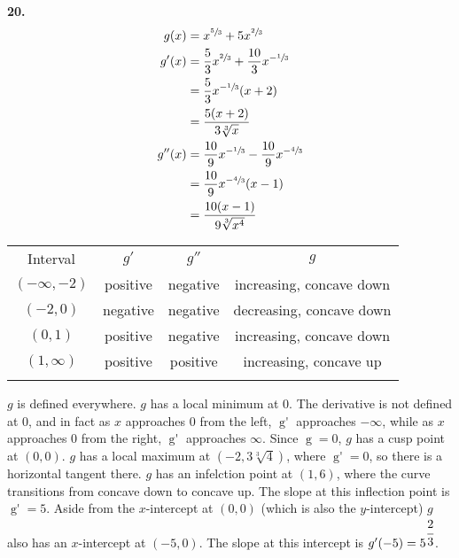 \documentclass[12pt,]{book}
\theoremstyle{plain}
\theoremstyle{definition}
\numberwithin{equation}{section}
\newcommand{\hrulethin}  {\noalign{\hrule height 0.04em}}
\newcommand{\hrulemedium}{\noalign{\hrule height 0.07em}}
\newcommand{\hrulethick} {\noalign{\hrule height 0.11em}}
\newcommand{\fe}[2]{\mathop{{#1}{\left(#2\right)}}}
\newcommand{\ointerval}[2]{\left(#1,#2\right)}
\newcommand{\point}[2]{\left(#1,#2\right)}
\newcommand{\fd}[1]{#1'}
\newcommand{\sd}[1]{#1''}
\begin{document}
\begin{multicols}{2}
{{
}
\par\smallskip
\noindent\textbf{20.}\quad{}\begin{align*}
\fe{g}{x}&=x^{\sfrac{5}{3}}+5x^{\sfrac{2}{3}}\\
\fe{\fd{g}}{x}&=\frac{5}{3}x^{\sfrac{2}{3}}+\frac{10}{3}x^{-\sfrac{1}{3}}\\
&=\frac{5}{3}x^{-\sfrac{1}{3}}(x+2)\\
&=\frac{5(x+2)}{3\sqrt[3]{x}}\\
\fe{\sd{g}}{x}&=\frac{10}{9}x^{-\sfrac{1}{3}}-\frac{10}{9}x^{-\sfrac{4}{3}}\\
&=\frac{10}{9}x^{-\sfrac{4}{3}}(x-1)\\
&=\frac{10(x-1)}{9\sqrt[3]{x^4}}
\end{align*}%
\begin{tabular}{cccc}\hrulethick
Interval&\(\fd{g}\)&\(\sd{g}\)&\(g\)\\\hrulemedium
\(\ointerval{-\infty}{-2}\)&positive&negative&increasing, concave down\\\hrulethin
\(\ointerval{-2}{0}\)&negative&negative&decreasing, concave down\\\hrulethin
\(\ointerval{0}{1}\)&positive&negative&increasing, concave down\\\hrulethin
\(\ointerval{1}{\infty}\)&positive&positive&increasing, concave up\\\hrulethin
\end{tabular}
\par
\(g\) is defined everywhere. \(g\) has a local minimum at \(0\). The derivative is not defined at \(0\), and in fact as \(x\) approaches \(0\) from the left, \(\fe{\fd{g}}{x}\) approaches \(-\infty\), while as \(x\) approaches \(0\) from the right, \(\fe{\fd{g}}{x}\) approaches \(\infty\). Since \(\fe{g}{0}=0\), \(g\) has a cusp point at \(\point{0}{0}\). \(g\) has a local maximum at \(\point{-2}{3\sqrt[3]{4}}\), where \(\fe{\fd{g}}{-2}=0\), so there is a horizontal tangent there. \(g\) has an infelction point at \(\point{1}{6}\), where the curve transitions from concave down to concave up. The slope at this inflection point is \(\fe{\fd{g}}{1}=5\). Aside from the \(x\)-intercept at \(\point{0}{0}\) (which is also the \(y\)-intercept) \(g\) also has an \(x\)-intercept at \(\point{-5}{0}\). The slope at this intercept is \(\fe{\fd{g}}{-5}=5^{\cfrac{2}{3}}\).%
}
\end{multicols}
\end{document}
